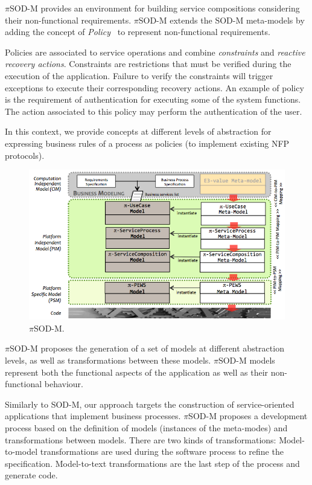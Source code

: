 $\pi$SOD-M provides an environment for building service compositions considering
their non-functional requirements. 
$\pi$SOD-M extends the SOD-M meta-models by adding
the concept of \textit{Policy}~\cite{Espinosa-Oviedo2011a}
to represent non-functional requirements.

Policies are associated to service operations and combine \textit{constraints} and \textit{reactive recovery actions}.
Constraints are restrictions that must be verified during the execution of the application. 
Failure to verify the constraints will trigger exceptions to execute their corresponding recovery actions.
An example of policy is the requirement of authentication for executing some of the system functions. 
The action associated to this policy may perform the authentication of the user.

In this context, we provide concepts at different levels of abstraction for expressing business rules of a process as policies (to implement existing NFP protocols).

\begin{figure}[h]
\centering
\includegraphics[width=1.0\textwidth]{figs/piSODM}
\caption{$\pi$SOD-M.}
\label{fig:piSOD-M}
\end{figure}

$\pi$SOD-M proposes the generation of a set of models at different abstraction levels, as
well as transformations between these models.
$\pi$SOD-M models represent both the functional aspects of the application as well as their non-functional behaviour. 


Similarly to SOD-M, our approach targets the construction of service-oriented applications that implement business processes.
$\pi$SOD-M proposes a development process based on the definition of models
(instances of the meta-modes) and transformations between models.
There are two kinds of transformations:
Model-to-model transformations are used during the software process to refine the specification.
Model-to-text transformations are the last step of the process and generate code.

